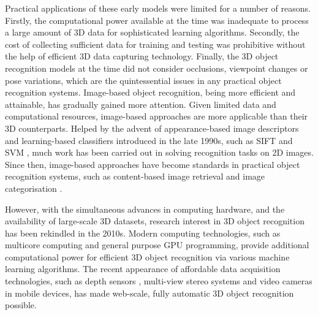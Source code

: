Practical applications of these early models were limited for a number of reasons. Firstly, the computational power available at the time was inadequate to process a large amount of 3D data for sophisticated learning algorithms. 
Secondly, the cost of collecting sufficient data for training and testing was prohibitive without the help of efficient 3D data capturing technology. 
Finally, the 3D object recognition models at the time did not consider occlusions, viewpoint changes or pose variations, which are the quintessential issues in any practical object recognition systems. 
Image-based object recognition, being more efficient and attainable, has gradually gained more attention. Given limited data and computational resources, image-based approaches are more applicable than their 3D counterparts.
Helped by the advent of appearance-based image descriptors and learning-based classifiers introduced in the late 1990s, such as SIFT \cite{Lowe2004} and SVM \cite{Chapelle1999}, much work has been carried out in solving recognition tasks on 2D images. Since then, image-based approaches have become standards in practical object recognition systems, such as content-based image retrieval \cite{Datta2008} and image categorisation \cite{Galleguillos2010}. 

However, with the simultaneous advances in computing hardware, and the availability of large-scale 3D datasets, research interest in 3D object recognition has been rekindled in the 2010s.  
Modern computing technologies, such as multicore computing and general purpose GPU programming, provide additional computational power for efficient 3D object recognition via various machine learning algorithms. The recent appearance of affordable data acquisition technologies, such as depth sensors \cite{Shotton2011}, multi-view stereo systems \cite{Vogiatzis2011} and video cameras in mobile devices, has made web-scale, fully automatic 3D object recognition possible.  

